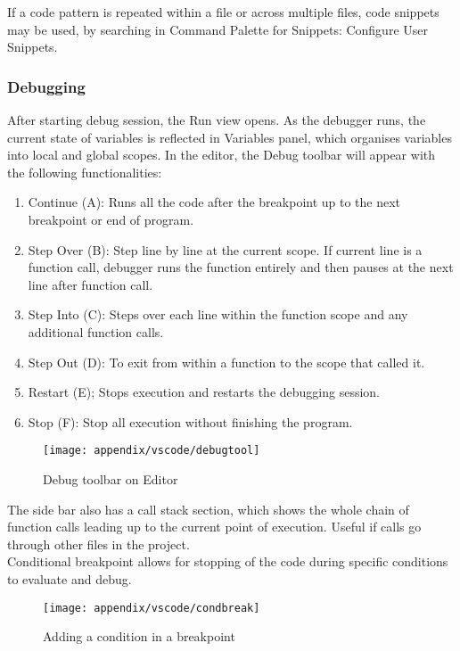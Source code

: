 If a code pattern is repeated within a file or across multiple files, code snippets may be used, by searching in Command Palette for Snippets: Configure User Snippets. 

\subsubsection{Debugging}

After starting debug session, the Run view opens. As the debugger runs, the current state of variables is reflected in Variables panel, which organises variables into local and global scopes. In the editor, the Debug toolbar will appear with the following functionalities:
\begin{enumerate}[label=\roman*.]
\setlength{\itemsep}{0pt}
\item Continue (A): Runs all the code after the breakpoint up to the next breakpoint or end of program.
\item Step Over (B): Step line by line at the current scope. If current line is a function call, debugger runs the function entirely and then pauses at the next line after function call.
\item Step Into (C): Steps over each line within the function scope and any additional function calls.
\item Step Out (D): To exit from within a function to the scope that called it.
\item Restart (E); Stops execution and restarts the debugging session.
\item Stop (F): Stop all execution without finishing the program.
\end{enumerate}

\begin{figure}[H]
\centering
\texttt{[image: appendix/vscode/debugtool]}
\caption{Debug toolbar on Editor}
\end{figure}

The side bar also has a call stack section, which shows the whole chain of function calls leading up to the current point of execution. Useful if calls go through other files in the project.\\

Conditional breakpoint allows for stopping of the code during specific conditions to evaluate and debug.

\begin{figure}[H]
\centering
\texttt{[image: appendix/vscode/condbreak]}
\caption{Adding a condition in a breakpoint}
\end{figure}

